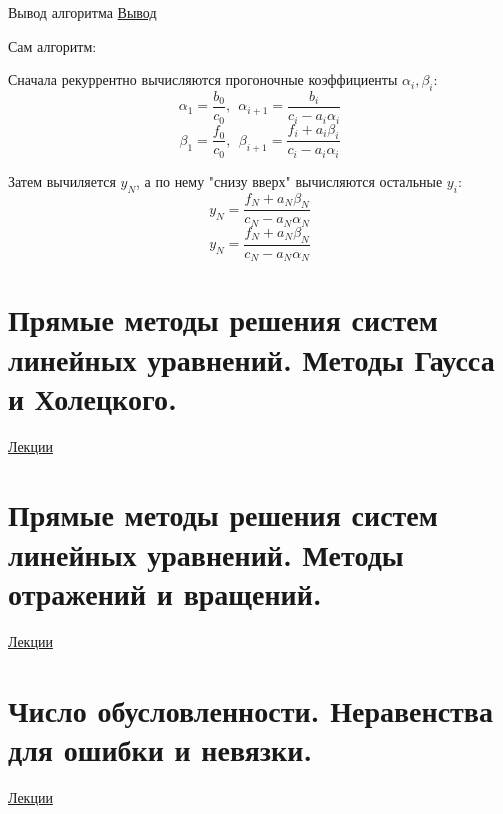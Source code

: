 \documentclass[specialist, subf, href, colorlinks=true, 12pt, times, mtpro, final]{disser}
\theoremstyle{definition}
\begin{document}
	Вывод алгоритма \hyperlink {lects.48}{Вывод}
	
	Сам алгоритм:
	
	Сначала рекуррентно вычисляются прогоночные коэффициенты $\alpha_i, \beta_i$:
	$$
	   \alpha_1 = \frac{b_0}{c_0}, \ \ \alpha_{i+1} = \frac{b_i}{c_i - a_i \alpha_i}
	$$
	$$
	   \beta_1 = \frac{f_0}{c_0}, \ \ \beta_{i+1} = \frac{f_i + a_i \beta_i}{c_i - a_i \alpha_i}
	$$

	Затем вычиляется $y_N$, а по нему "снизу вверх" вычисляются остальные $y_i$:
	$$
	   y_N = \frac{f_N + a_N \beta_N}{c_N - a_N \alpha_N}
	$$
	$$
	   y_N = \frac{f_N + a_N \beta_N}{c_N - a_N \alpha_N}
	$$

	
\section {Прямые методы решения систем линейных уравнений. Методы Гаусса и Холецкого.}
	\hyperlink {lects.51}{Лекции}\\

\section {Прямые методы решения систем линейных уравнений. Методы отражений и вращений.}
	\hyperlink {lects.54}{Лекции}\\

\section {Число обусловленности. Неравенства для ошибки и невязки.}
	\hyperlink {lects.56}{Лекции}\\
\end{document}
